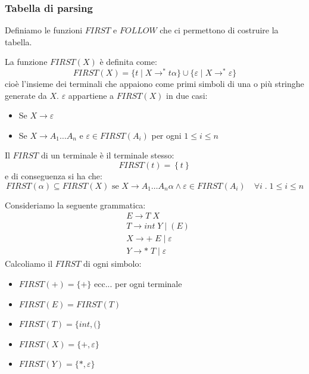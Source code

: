 \documentclass[a4paper]{article}
\begin{document}
\subsubsection{Tabella di parsing}
Definiamo le funzioni \( FIRST \) e \( FOLLOW \) che ci permettono di costruire la tabella.

\vspace{1em}
\noindent
\begin{definition}
  La funzione \( FIRST(X) \) è definita come:
  \[
    FIRST(X) = \{ t \mid X \to^* t \alpha \} \cup \{ \varepsilon \mid X \to^* \varepsilon \}
  \] 
  cioè l'insieme dei terminali che appaiono come primi simboli di una o più stringhe generate
  da \( X \). \( \varepsilon  \) appartiene a \( FIRST(X) \) in due casi:
  \begin{itemize}
    \item Se \( X \to \varepsilon  \) 
    \item Se \( X \to A_1 \ldots A_n \) e \( \varepsilon  \in FIRST(A_i) \) per ogni
      \( 1 \le i \le n \) 
  \end{itemize}
  Il \( FIRST \) di un terminale è il terminale stesso:
  \[
    FIRST(t) = \left\{ t \right\}
  \] 
  e di conseguenza si ha che:
  \[
    FIRST(\alpha) \subseteq FIRST(X) \text{ se } X \to A_1 \ldots A_n \alpha \land 
    \varepsilon \in FIRST(A_i) \quad \forall i \;.\; 1 \le i \le n
  \] 
\end{definition}

\begin{example}
  Consideriamo la seguente grammatica:
  \[
    \begin{aligned}
      &E \to T \; X \\
      &T \to int \; Y \mid (E) \\
      &X \to + \; E \mid \varepsilon \\
      &Y \to * \; T \mid \varepsilon
    \end{aligned}
  \] 
  Calcoliamo il \( FIRST \) di ogni simbolo:
  \begin{itemize}
    \item \( FIRST(+) = \{ + \} \) ecc... per ogni terminale
    \item \( FIRST(E) = FIRST(T) \)
    \item \( FIRST(T) = \{ int, ( \} \)
    \item \( FIRST(X) = \{ +, \varepsilon \} \)
    \item \( FIRST(Y) = \{ *, \varepsilon \} \)
  \end{itemize}
\end{example}
\end{document}
